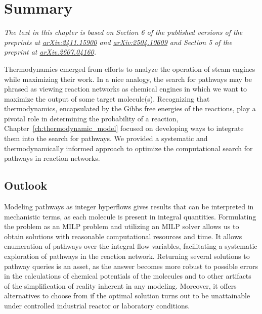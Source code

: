 \chapter{Summary}
\label{ch:conclusion} %

{\sffamily\slshape The text in this chapter is based on Section 6 of the published versions of the preprints at \href{https://arxiv.org/abs/2411.15900}{arXiv:2411.15900} and \href{https://arxiv.org/abs/2504.10609}{arXiv:2504.10609} and  Section 5 of the preprint at \href{https://arxiv.org/abs/2504.10609}{arXiv.2607.04160}.\\}

Thermodynamics emerged from efforts to analyze the operation of steam engines while maximizing their work.
In a nice analogy, the search for pathways may be phrased as viewing reaction networks as chemical engines in which we want to maximize the output of some target molecule(s).
Recognizing that thermodynamics, encapsulated by the Gibbs free energies of the reactions, play a pivotal role in determining the probability of a reaction, Chapter~\ref{ch:thermodynamic_model} focused on developing ways to integrate them into the search for pathways.
We provided a systematic and thermodynamically informed approach to optimize the computational search for pathways in reaction networks.

\section{Outlook}

Modeling pathways as integer hyperflows gives results that can be interpreted in mechanistic terms,
as each molecule is present in integral quantities.
Formulating the problem as an MILP problem and utilizing an MILP solver allows us to obtain solutions with reasonable computational resources and time.
It allows enumeration of pathways over the integral flow variables, facilitating a systematic exploration of pathways in the reaction network.
Returning several solutions to pathway queries is an asset, as the answer becomes more robust to possible errors in the calculations of chemical potentials of the molecules and to other artifacts of the simplification of reality inherent in any modeling.
Moreover, it offers alternatives to choose from if the optimal solution turns out to be unattainable under controlled industrial reactor or laboratory conditions. 

